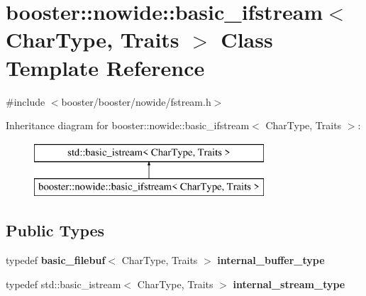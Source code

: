 \section{booster\+:\+:nowide\+:\+:basic\+\_\+ifstream$<$ Char\+Type, Traits $>$ Class Template Reference}
\label{classbooster_1_1nowide_1_1basic__ifstream}


{\ttfamily \#include $<$booster/booster/nowide/fstream.\+h$>$}

Inheritance diagram for booster\+:\+:nowide\+:\+:basic\+\_\+ifstream$<$ Char\+Type, Traits $>$\+:\begin{figure}[H]
\begin{center}
\leavevmode
\includegraphics[height=2.000000cm]{classbooster_1_1nowide_1_1basic__ifstream}
\end{center}
\end{figure}
\subsection*{Public Types}
\begin{DoxyCompactItemize}
\item 
typedef {\bf basic\+\_\+filebuf}$<$ Char\+Type, Traits $>$ {\bfseries internal\+\_\+buffer\+\_\+type}\label{classbooster_1_1nowide_1_1basic__ifstream_a69bfa84177d7a4d357958164a2015b3c}

\item 
typedef std\+::basic\+\_\+istream$<$ Char\+Type, Traits $>$ {\bfseries internal\+\_\+stream\+\_\+type}\label{classbooster_1_1nowide_1_1basic__ifstream_a9baee407ad1c3fd5ac837b206ed122c8}

\end{DoxyCompactItemize}
